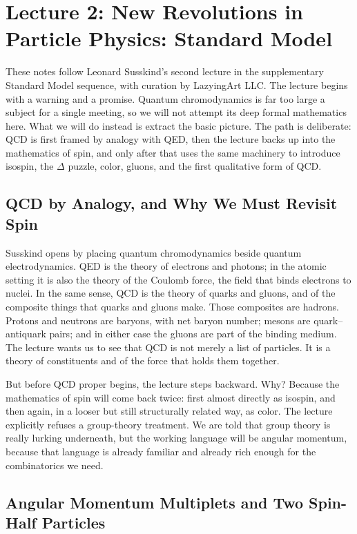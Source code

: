 \chapter{Lecture 2: New Revolutions in Particle Physics: Standard Model}

These notes follow Leonard Susskind's second lecture in the supplementary Standard Model sequence, with curation by LazyingArt LLC. The lecture begins with a warning and a promise. Quantum chromodynamics is far too large a subject for a single meeting, so we will not attempt its deep formal mathematics here. What we will do instead is extract the basic picture. The path is deliberate: QCD is first framed by analogy with QED, then the lecture backs up into the mathematics of spin, and only after that uses the same machinery to introduce isospin, the \(\Delta\) puzzle, color, gluons, and the first qualitative form of QCD.

\section{QCD by Analogy, and Why We Must Revisit Spin}

Susskind opens by placing quantum chromodynamics beside quantum electrodynamics. QED is the theory of electrons and photons; in the atomic setting it is also the theory of the Coulomb force, the field that binds electrons to nuclei. In the same sense, QCD is the theory of quarks and gluons, and of the composite things that quarks and gluons make. Those composites are hadrons. Protons and neutrons are baryons, with net baryon number; mesons are quark--antiquark pairs; and in either case the gluons are part of the binding medium. The lecture wants us to see that QCD is not merely a list of particles. It is a theory of constituents and of the force that holds them together.

But before QCD proper begins, the lecture steps backward. Why? Because the mathematics of spin will come back twice: first almost directly as isospin, and then again, in a looser but still structurally related way, as color. The lecture explicitly refuses a group-theory treatment. We are told that group theory is really lurking underneath, but the working language will be angular momentum, because that language is already familiar and already rich enough for the combinatorics we need.

\section{Angular Momentum Multiplets and Two Spin-Half Particles}

